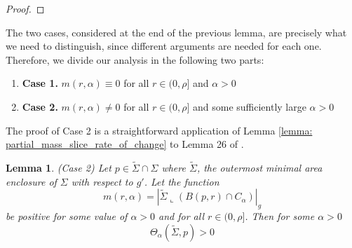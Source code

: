 \documentclass{amsart}
\newcommand{\ts}{\tilde{\Sigma}}
\newtheorem{lemma}{Lemma}
\theoremstyle{named}
\begin{document}
\begin{proof}

    
\end{proof}

The two cases, considered at the end of the previous lemma, are precisely what we need to distinguish, since different arguments are needed for each one. Therefore, we divide our analysis in the following two parts:

\begin{enumerate}
    \item \textbf{Case 1.} $m(r,\alpha) \equiv 0 $ for all $r \in (0,\rho]$ and $\alpha > 0$
    \item \textbf{Case 2.} $m(r,\alpha) \neq 0 $ for all $r \in (0,\rho]$ and some sufficiently large $\alpha > 0$
\end{enumerate}

The proof of Case 2 is a straightforward application of Lemma \ref{lemma: partial_mass_slice_rate_of_change} to Lemma 26 of \cite{jeff}.

\begin{lemma} \label{lemma: zeropardensity_mgeq0}
    (Case 2) Let $p \in \ts \cap \Sigma$ where $\ts$, the outermost minimal area enclosure of $\Sigma$ with respect to $g'$. Let the function 
    \begin{equation} \nonumber
        m(r,\alpha) = |\ts \llcorner (B(p,r) \cap C_{\alpha} )|_g
    \end{equation}
    be positive for some value of $\alpha > 0$ and for all $r \in (0,\rho]$. Then for some $\alpha > 0 $ 
    \begin{equation} \nonumber
        \Theta_{\alpha}(\ts,p) > 0  
    \end{equation}
\end{lemma}
\end{document}
